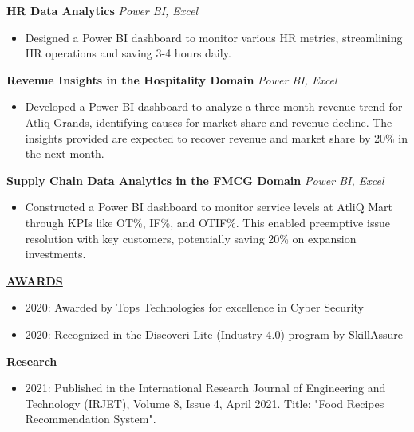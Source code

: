 \documentclass{article}
\begin{document}
\noindent \textbf{HR Data Analytics} \textit{Power BI, Excel} \hfill \textbf{}
\begin{itemize}[noitemsep,nolistsep,leftmargin=*]
\item {\small Designed a Power BI dashboard to monitor various HR metrics, streamlining HR operations and saving 3-4 hours daily.}
\end{itemize}

\noindent \textbf{Revenue Insights in the Hospitality Domain} \textit{Power BI, Excel} \hfill \textbf{}
\begin{itemize}[noitemsep,nolistsep,leftmargin=*]
\item {\small Developed a Power BI dashboard to analyze a three-month revenue trend for Atliq Grands, identifying causes for market share and revenue decline. The insights provided are expected to recover revenue and market share by 20\% in the next month.}
\end{itemize}

\noindent \textbf{Supply Chain Data Analytics in the FMCG Domain} \textit{Power BI, Excel} \hfill \textbf{}
\begin{itemize}[noitemsep,nolistsep,leftmargin=*]
\item {\small Constructed a Power BI dashboard to monitor service levels at AtliQ Mart through KPIs like OT\%, IF\%, and OTIF\%. This enabled preemptive issue resolution with key customers, potentially saving 20\% on expansion investments.}\\
\end{itemize}

\noindent \textbf{\underline{AWARDS}} 
\begin{itemize}[noitemsep,nolistsep,leftmargin=*]
\item {\small 2020: Awarded by Tops Technologies for excellence in Cyber Security}
\item {\small 2020: Recognized in the Discoveri Lite (Industry 4.0) program by SkillAssure}\\
\end{itemize}




\noindent \textbf{\underline{Research}} 
\begin{itemize}[noitemsep,nolistsep,leftmargin=*]
\item {\small 2021: Published in the International Research Journal of Engineering and Technology (IRJET), Volume 8, Issue 4, April 2021. Title: "Food Recipes Recommendation System".}
\end{itemize}
\end{document}

